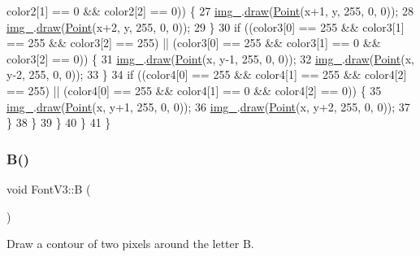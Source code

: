 \begin{DoxyCode}
      color2[1] == 0 \&\& color2[2] == 0)) \{
27                     \mbox{\hyperlink{class_font_v1_a00569e3e3c4b70f437b63f396f735fb0}{img\_}}.\mbox{\hyperlink{class_image_a8d162f3cab956131d58708c09aa560b0}{draw}}(\mbox{\hyperlink{class_point}{Point}}(x+1, y, 255, 0, 0));
28                     \mbox{\hyperlink{class_font_v1_a00569e3e3c4b70f437b63f396f735fb0}{img\_}}.\mbox{\hyperlink{class_image_a8d162f3cab956131d58708c09aa560b0}{draw}}(\mbox{\hyperlink{class_point}{Point}}(x+2, y, 255, 0, 0));
29                 \}
30                 \textcolor{keywordflow}{if} ((color3[0] == 255 \&\& color3[1] == 255 \&\& color3[2] == 255) || (color3[0] == 255 \&\& 
      color3[1] == 0 \&\& color3[2] == 0)) \{
31                     \mbox{\hyperlink{class_font_v1_a00569e3e3c4b70f437b63f396f735fb0}{img\_}}.\mbox{\hyperlink{class_image_a8d162f3cab956131d58708c09aa560b0}{draw}}(\mbox{\hyperlink{class_point}{Point}}(x, y-1, 255, 0, 0));
32                     \mbox{\hyperlink{class_font_v1_a00569e3e3c4b70f437b63f396f735fb0}{img\_}}.\mbox{\hyperlink{class_image_a8d162f3cab956131d58708c09aa560b0}{draw}}(\mbox{\hyperlink{class_point}{Point}}(x, y-2, 255, 0, 0));
33                 \}
34                 \textcolor{keywordflow}{if} ((color4[0] == 255 \&\& color4[1] == 255 \&\& color4[2] == 255) || (color4[0] == 255 \&\& 
      color4[1] == 0 \&\& color4[2] == 0)) \{
35                     \mbox{\hyperlink{class_font_v1_a00569e3e3c4b70f437b63f396f735fb0}{img\_}}.\mbox{\hyperlink{class_image_a8d162f3cab956131d58708c09aa560b0}{draw}}(\mbox{\hyperlink{class_point}{Point}}(x, y+1, 255, 0, 0));
36                     \mbox{\hyperlink{class_font_v1_a00569e3e3c4b70f437b63f396f735fb0}{img\_}}.\mbox{\hyperlink{class_image_a8d162f3cab956131d58708c09aa560b0}{draw}}(\mbox{\hyperlink{class_point}{Point}}(x, y+2, 255, 0, 0));
37                 \}
38             \}
39         \}
40     \}
41 \}
\end{DoxyCode}
\mbox{\label{class_font_v3_aa6528f56e5354e83f610dbf821b62889}} 
\subsubsection{\texorpdfstring{B()}{B()}}
{\footnotesize\ttfamily void Font\+V3\+::B (\begin{DoxyParamCaption}{ }\end{DoxyParamCaption})}



Draw a contour of two pixels around the letter B. 


